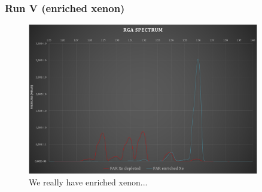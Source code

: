 

\begin{frame}
\frametitle{Run V (enriched xenon)} 
\begin{figure}
  \begin{center}
    \includegraphics[width=0.9\textwidth]{moriond/XeEnriched.png} 
    \caption{We really have enriched xenon...}
    \label{fig:exe}
  \end{center}
\end{figure}
\end{frame}

